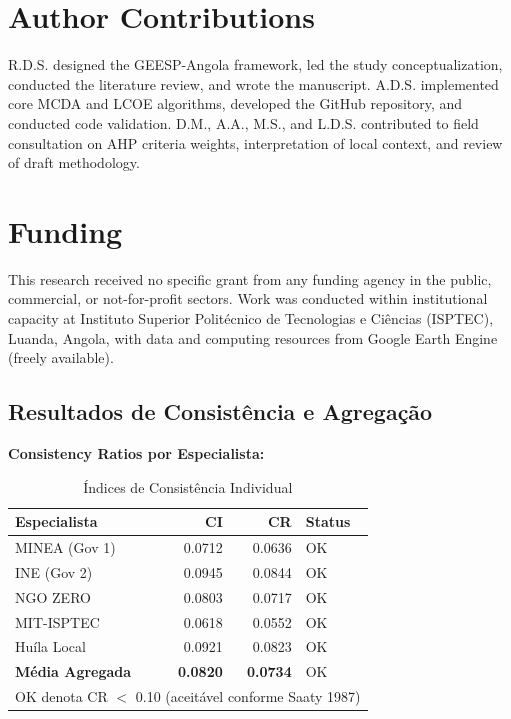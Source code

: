 \documentclass[12pt, a4paper]{article}
\begin{document}
\section*{Author Contributions}
R.D.S. designed the GEESP-Angola framework, led the study conceptualization, conducted the literature review, and wrote the manuscript. A.D.S. implemented core MCDA and LCOE algorithms, developed the GitHub repository, and conducted code validation. D.M., A.A., M.S., and L.D.S. contributed to field consultation on AHP criteria weights, interpretation of local context, and review of draft methodology.

\section*{Funding}
This research received no specific grant from any funding agency in the public, commercial, or not-for-profit sectors. Work was conducted within institutional capacity at Instituto Superior Politécnico de Tecnologias e Ciências (ISPTEC), Luanda, Angola, with data and computing resources from Google Earth Engine (freely available).

\subsection{Resultados de Consistência e Agregação}

\textbf{Consistency Ratios por Especialista:}

\begin{table}[H]
\centering
\small
\caption{Índices de Consistência Individual}
\label{tab:cr_individual}
\begin{tabular}{|l|r|r|l|}
\hline
\textbf{Especialista} & \textbf{CI} & \textbf{CR} & \textbf{Status} \\
\hline
MINEA (Gov 1) & 0.0712 & 0.0636 & OK \\
INE (Gov 2) & 0.0945 & 0.0844 & OK \\
NGO ZERO & 0.0803 & 0.0717 & OK \\
MIT-ISPTEC & 0.0618 & 0.0552 & OK \\
Huíla Local & 0.0921 & 0.0823 & OK \\
\hline
\textbf{Média Agregada} & \textbf{0.0820} & \textbf{0.0734} & OK \\
\hline
\multicolumn{4}{|l|}{OK denota CR $<$ 0.10 (aceitável conforme Saaty 1987)} \\
\hline
\end{tabular}
\end{table}
\end{document}
